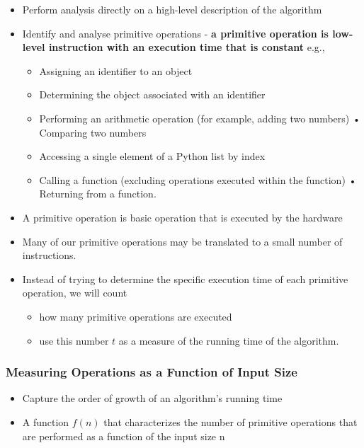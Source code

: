 \documentclass[11pt]{article}
\providecommand{\tightlist}{%
      \setlength{\itemsep}{0pt}\setlength{\parskip}{0pt}}
\begin{document}
\begin{itemize}
\tightlist
\item
  Perform analysis directly on a high-level description of the algorithm
\item
  Identify and analyse primitive operations - \textbf{a primitive
  operation is low-level instruction with an execution time that is
  constant} e.g.,

  \begin{itemize}
  \tightlist
  \item
    Assigning an identifier to an object
  \item
    Determining the object associated with an identifier
  \item
    Performing an arithmetic operation (for example, adding two numbers)
    • Comparing two numbers
  \item
    Accessing a single element of a Python list by index
  \item
    Calling a function (excluding operations executed within the
    function) • Returning from a function.
  \end{itemize}
\item
  A primitive operation is basic operation that is executed by the
  hardware
\item
  Many of our primitive operations may be translated to a small number
  of instructions.
\item
  Instead of trying to determine the specific execution time of each
  primitive operation, we will count

  \begin{itemize}
  \tightlist
  \item
    how many primitive operations are executed
  \item
    use this number \(t\) as a measure of the running time of the
    algorithm.
  \end{itemize}
\end{itemize}

    \hypertarget{measuring-operations-as-a-function-of-input-size}{%
\subsubsection{Measuring Operations as a Function of Input
Size}\label{measuring-operations-as-a-function-of-input-size}}

\begin{itemize}
\tightlist
\item
  Capture the order of growth of an algorithm's running time
\item
  A function \(f(n)\) that characterizes the number of primitive
  operations that are performed as a function of the input size n
\end{itemize}
\end{document}

